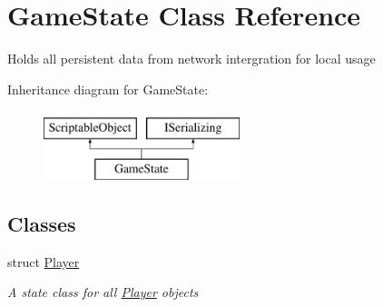 \hypertarget{class_game_state}{\section{Game\-State Class Reference}
\label{class_game_state}
}


Holds all persistent data from network intergration for local usage  


Inheritance diagram for Game\-State\-:\begin{figure}[H]
\begin{center}
\leavevmode
\includegraphics[height=2.000000cm]{class_game_state}
\end{center}
\end{figure}
\subsection*{Classes}
\begin{DoxyCompactItemize}
\item 
struct \hyperlink{class_game_state_1_1_player}{Player}
\begin{DoxyCompactList}\small\item\em A state class for all \hyperlink{class_game_state_1_1_player}{Player} objects \end{DoxyCompactList}\end{DoxyCompactItemize}
